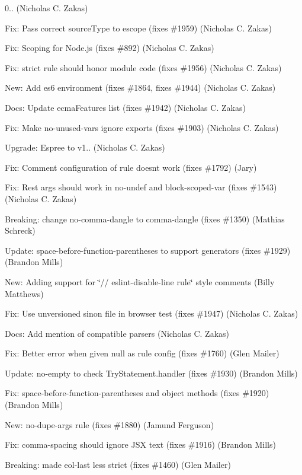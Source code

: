 \begin{DoxyItemize}
\item 0.. (Nicholas C. Zakas)
\item Fix\+: Pass correct source\+Type to escope (fixes \#1959) (Nicholas C. Zakas)
\item Fix\+: Scoping for Node.\+js (fixes \#892) (Nicholas C. Zakas)
\item Fix\+: strict rule should honor module code (fixes \#1956) (Nicholas C. Zakas)
\item New\+: Add es6 environment (fixes \#1864, fixes \#1944) (Nicholas C. Zakas)
\item Docs\+: Update ecma\+Features list (fixes \#1942) (Nicholas C. Zakas)
\item Fix\+: Make no-\/unused-\/vars ignore exports (fixes \#1903) (Nicholas C. Zakas)
\item Upgrade\+: Espree to v1.. (Nicholas C. Zakas)
\item Fix\+: Comment configuration of rule doesn\textquotesingle{}t work (fixes \#1792) (Jary)
\item Fix\+: Rest args should work in no-\/undef and block-\/scoped-\/var (fixes \#1543) (Nicholas C. Zakas)
\item Breaking\+: change no-\/comma-\/dangle to comma-\/dangle (fixes \#1350) (Mathias Schreck)
\item Update\+: space-\/before-\/function-\/parentheses to support generators (fixes \#1929) (Brandon Mills)
\item New\+: Adding support for \char`\"{}// eslint-\/disable-\/line rule\char`\"{} style comments (Billy Matthews)
\item Fix\+: Use unversioned sinon file in browser test (fixes \#1947) (Nicholas C. Zakas)
\item Docs\+: Add mention of compatible parsers (Nicholas C. Zakas)
\item Fix\+: Better error when given null as rule config (fixes \#1760) (Glen Mailer)
\item Update\+: no-\/empty to check Try\+Statement.\+handler (fixes \#1930) (Brandon Mills)
\item Fix\+: space-\/before-\/function-\/parentheses and object methods (fixes \#1920) (Brandon Mills)
\item New\+: no-\/dupe-\/args rule (fixes \#1880) (Jamund Ferguson)
\item Fix\+: comma-\/spacing should ignore J\+SX text (fixes \#1916) (Brandon Mills)
\item Breaking\+: made eol-\/last less strict (fixes \#1460) (Glen Mailer)

\end{DoxyItemize}
